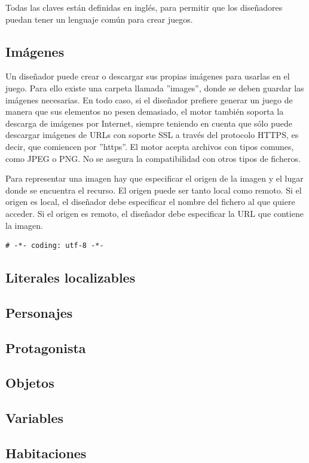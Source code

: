 Todas las claves están definidas en inglés, para permitir que los diseñadores puedan tener un lenguaje común para crear juegos.

\subsection{Imágenes}
Un diseñador puede crear o descargar sus propias imágenes para usarlas en el juego. Para ello existe una carpeta llamada ''images'', donde se deben guardar las imágenes necesarias.
En todo caso, si el diseñador prefiere generar un juego de manera que sus elementos no pesen demasiado, el motor también soporta la descarga de imágenes por Internet, siempre teniendo en cuenta que sólo puede descargar imágenes de URLs con soporte SSL a través del protocolo HTTPS, es decir, que comiencen por ''https''.
El motor acepta archivos con tipos comunes, como JPEG o PNG. No se asegura la compatibilidad con otros tipos de ficheros.

Para representar una imagen hay que especificar el origen de la imagen y el lugar donde se encuentra el recurso. El origen puede ser tanto local como remoto. Si el origen es local, el diseñador debe especificar el nombre del fichero al que quiere acceder. Si el origen es remoto, el diseñador debe especificar la URL que contiene la imagen. 

\begin{lstlisting}[style=Python]
# -*- coding: utf-8 -*-

\end{lstlisting}


\subsection{Literales localizables}
\subsection{Personajes}
\subsection{Protagonista}
\subsection{Objetos}
\subsection{Variables}
\subsection{Habitaciones}

